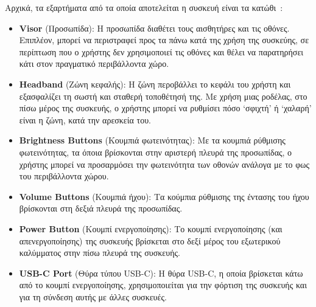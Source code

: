 Αρχικά, τα εξαρτήματα από τα οποία αποτελείται η συσκευή είναι τα κατώθι~\cite{scooley_2023_hololens}\cite{microsoft_hololens}:
\begin{itemize}
    \item \textbf{Visor} (Προσωπίδα): Η προσωπίδα διαθέτει τους αισθητήρες και τις οθόνες. Επιπλέον, μπορεί να περιστραφεί προς τα πάνω κατά της χρήση της συσκεύης, σε περίπτωση που ο χρήστης δεν χρησιμοποιεί τις οθόνες και θέλει να παρατηρήσει κάτι στον πραγματικό περιβάλλοντα χώρο.
    \item \textbf{Headband} (Ζώνη κεφαλής): Η ζώνη περοβάλλει το κεφάλι του χρήστη και εξασφαλίζει τη σωστή και σταθερή τοποθέτησή της. Με χρήση μιας ροδέλας, στο πίσω μέρος της συσκευής, ο χρήστης μπορεί να ρυθμίσει πόσο `σφιχτή' ή `χαλαρή' είναι η ζώνη, κατά την αρεσκεία του.
    \item \textbf{Brightness Buttons} (Κουμπιά φωτεινότητας): Με τα κουμπιά ρύθμισης φωτεινότητας, τα όποια βρίσκονται στην αριστερή πλευρά της προσωπίδας, ο χρήστης μπορεί να προσαρμόσει την φωτεινότητα των οθονών ανάλογα με το φως του περιβάλλοντα χώρου.
    \item \textbf{Volume Buttons} (Κουμπιά ήχου): Τα κούμπια ρύθμισης της έντασης του ήχου βρίσκονται στη δεξιά πλευρά της προσωπίδας.
    \item \textbf{Power Button} (Κουμπί ενεργοποίησης): Το κουμπί ενεργοποίησης (και απενεργοποίησης) της συσκευής βρίσκεται στο δεξί μέρος του εξωτερικού καλύμματος στην πίσω πλευρά της συσκευής.
    \item \textbf{USB-C Port} (Θύρα τύπου USB-C): Η θύρα USB-C, η οποία βρίσκεται κάτω από το κουμπί ενεργοποίησης, χρησιμοποιείται για την φόρτιση της συσκευής και για τη σύνδεση αυτής με άλλες συσκευές.
\end{itemize}

